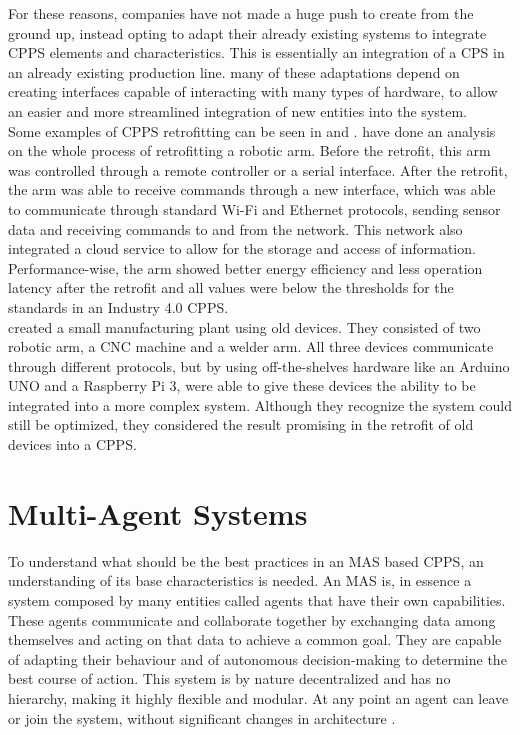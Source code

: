 For these reasons, companies have not made a huge push to create  from the ground up, instead opting to adapt their already existing systems to integrate \acrshort{CPPS} elements and characteristics. This is essentially an integration of a \acrshort{CPS} in an already existing production line. many of these adaptations depend on creating interfaces capable of interacting with many types of hardware, to allow an easier and more streamlined integration of new entities into the system.\\

Some examples of \acrshort{CPPS} retrofitting can be seen in \citeauthor{CARDIN201911} \cite{CARDIN201911} and \citeauthor{8328326} \cite{8328326}. \citeauthor{CARDIN201911} \cite{CARDIN201911} have done an analysis on the whole process of retrofitting a robotic arm. Before the retrofit, this arm was controlled through a remote controller or a serial interface. After the retrofit, the arm was able to receive commands through a new interface, which was able to communicate through standard Wi-Fi and Ethernet protocols, sending sensor data and receiving commands to and from the network. This network also integrated a cloud service to allow for the storage and access of information. Performance-wise, the arm showed better energy efficiency and less operation latency after the retrofit and all values were below the thresholds for the standards in an Industry 4.0 \acrshort{CPPS}.\\

\citeauthor{8328326} \cite{8328326} created a small manufacturing plant using old devices. They consisted of two robotic arm, a CNC machine and a welder arm. All three devices communicate through different protocols, but by using off-the-shelves hardware like an Arduino UNO and a Raspberry Pi 3, \citeauthor{8328326} were able to give these devices the ability to be integrated into a more complex system. Although they recognize the system could still be optimized, they considered the result promising in the retrofit of old devices into a \acrshort{CPPS}.

\section{Multi-Agent Systems}
\label{sec:multi-agent_systems}


To understand what should be the best practices in an \acrshort{MAS} based \acrshort{CPPS}, an understanding of its base characteristics is needed. An \acrshort{MAS} is, in essence a system composed by many entities called agents that have their own capabilities. These agents communicate and collaborate together by exchanging data among themselves and acting on that data to achieve a common goal. They are capable of adapting their behaviour and of autonomous decision-making to determine the best course of action. This system is by nature decentralized and has no hierarchy, making it highly flexible and modular. At any point an agent can leave or join the system, without significant changes in architecture \cite{paulo02}.\\

